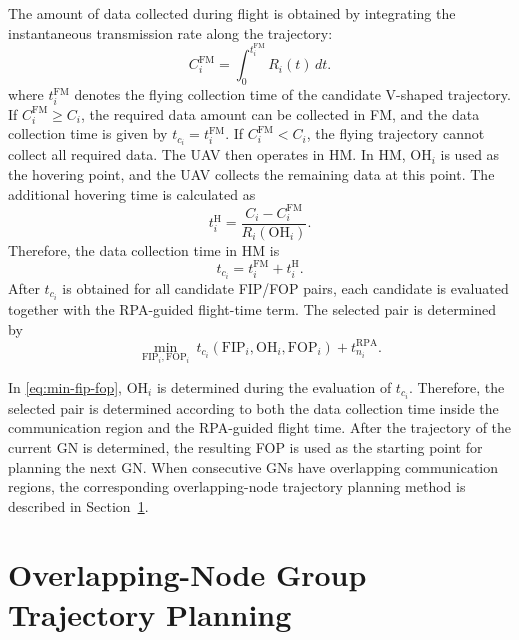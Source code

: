 \documentclass[12pt]{ksthesis}
\begin{document}
\begin{thesis}
{    The amount of data collected during flight is obtained by integrating the instantaneous transmission rate along the trajectory:
    \begin{equation}
        C_i^{\mathrm{FM}}=\int_{0}^{t_i^{\mathrm{FM}}} R_i(t)\,dt.
    \end{equation}
    where \(t_i^{\mathrm{FM}}\) denotes the flying collection time of the candidate V-shaped trajectory. If \(C_i^{\mathrm{FM}}\geq C_i\), the required data amount can be collected in FM, and the data collection time is given by \(t_{c_i}=t_i^{\mathrm{FM}}\). If \(C_i^{\mathrm{FM}}<C_i\), the flying trajectory cannot collect all required data. The UAV then operates in HM. In HM, \(\mathrm{OH}_i\) is used as the hovering point, and the UAV collects the remaining data at this point. The additional hovering time is calculated as
    \begin{equation}
        t_i^{\mathrm{H}}=\frac{C_i-C_i^{\mathrm{FM}}}{R_i(\mathrm{OH}_i)}.
    \end{equation}
    Therefore, the data collection time in HM is
    \begin{equation}
        t_{c_i}=t_i^{\mathrm{FM}}+t_i^{\mathrm{H}}.
    \end{equation}
    After \(t_{c_i}\) is obtained for all candidate FIP/FOP pairs, each candidate is evaluated together with the RPA-guided flight-time term. The selected pair is determined by
    \begin{equation}\label{eq:min-fip-fop}
        \min_{\mathrm{FIP}_i,\mathrm{FOP}_i}
        \ t_{c_i}\left(\mathrm{FIP}_i,\mathrm{OH}_i,\mathrm{FOP}_i\right)
        + t_{n_i}^{\mathrm{RPA}} .
    \end{equation}

    In \eqref{eq:min-fip-fop}, \(\mathrm{OH}_i\) is determined during the evaluation of \(t_{c_i}\). Therefore, the selected pair is determined according to both the data collection time inside the communication region and the RPA-guided flight time. After the trajectory of the current GN is determined, the resulting FOP is used as the starting point for planning the next GN. When consecutive GNs have overlapping communication regions, the corresponding overlapping-node trajectory planning method is described in Section~\ref{sec:4.3}.


\section{Overlapping-Node Group Trajectory Planning}\label{sec:4.3}

}
\end{thesis}
\end{document}
